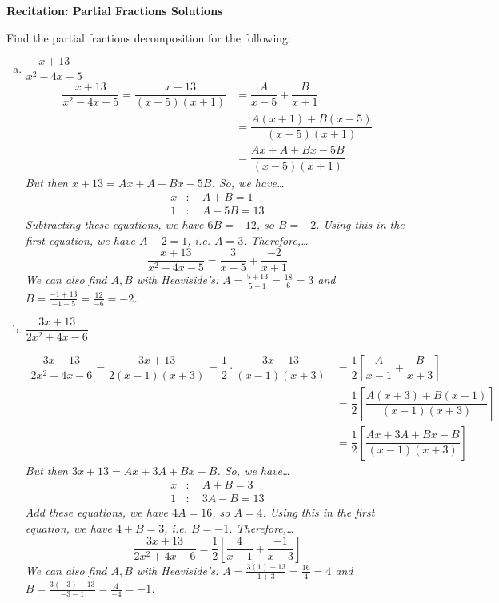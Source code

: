 \documentclass[11pt,letterpaper]{article}
\begin{document}

\phantom{} \hfill {\bfseries \Large Recitation: Partial Fractions Solutions} \hfill \phantom{} \par\vspace{0.5cm}

 Find the partial fractions decomposition for the following:
	\begin{enumerate}[(a)]
	\item $\dfrac{x + 13}{x^2 - 4x - 5}$ 
		\[
		\begin{aligned}
		\dfrac{x + 13}{x^2 - 4x - 5}= \dfrac{x + 13}{(x - 5)(x + 1)}&= \dfrac{A}{x - 5} + \dfrac{B}{x + 1} \\[0.3cm]
		&= \dfrac{A(x + 1) + B(x - 5)}{(x - 5)(x + 1)} \\[0.3cm]
		&= \dfrac{Ax + A + Bx - 5B}{(x - 5)(x + 1)}
		\end{aligned}
		\]
	{\itshape But then $x + 13= Ax + A + Bx - 5B$. So, we have\dots}
		\[
		\begin{aligned}
		x &\colon\quad A + B= 1 \\
		1 &\colon\quad A - 5B= 13
		\end{aligned}
		\]
	{\itshape Subtracting these equations, we have $6B= -12$, so $B= -2$. Using this in the first equation, we have $A - 2= 1$, i.e. $A= 3$. Therefore,\dots}
		\[
		\dfrac{x + 13}{x^2 - 4x - 5}= \boxed{\dfrac{3}{x - 5} + \dfrac{-2}{x + 1}}
		\]
	{\itshape We can also find $A, B$ with Heaviside's: $A= \tfrac{5 + 13}{5 + 1}= \tfrac{18}{6}= 3$ and $B= \tfrac{-1 + 13}{-1 - 5}= \tfrac{12}{-6}= -2$.} \par\vspace{0.3cm}
	
	\item $\dfrac{3x + 13}{2x^2 + 4x - 6}$ 
	
		\[
		\begin{aligned}
		\dfrac{3x + 13}{2x^2 + 4x - 6}= \dfrac{3x + 13}{2(x - 1)(x + 3)}= \dfrac{1}{2} \cdot \dfrac{3x + 13}{(x - 1)(x + 3)}&= \dfrac{1}{2} \left[ \dfrac{A}{x - 1} + \dfrac{B}{x + 3} \right] \\[0.3cm]
		&= \dfrac{1}{2} \left[ \dfrac{A(x + 3) + B(x - 1)}{(x - 1)(x + 3)} \right]\\[0.3cm]
		&= \dfrac{1}{2} \left[ \dfrac{Ax + 3A + Bx - B}{(x - 1)(x + 3)} \right]
		\end{aligned}
		\]
	{\itshape But then $3x + 13= Ax + 3A + Bx - B$. So, we have\dots}
		\[
		\begin{aligned}
		x &\colon\quad A + B= 3 \\
		1 &\colon\quad 3A - B= 13
		\end{aligned}
		\]
	{\itshape Add these equations, we have $4A= 16$, so $A= 4$. Using this in the first equation, we have $4 + B= 3$, i.e. $B= -1$. Therefore,\dots}
		\[
		\boxed{\dfrac{3x + 13}{2x^2 + 4x - 6}= \dfrac{1}{2} \left[ \dfrac{4}{x - 1} + \dfrac{-1}{x + 3} \right]}
		\]
	{\itshape We can also find $A, B$ with Heaviside's: $A= \tfrac{3(1) + 13}{1 + 3}= \tfrac{16}{4}= 4$ and $B= \tfrac{3(-3) + 13}{-3 - 1}= \tfrac{4}{-4}= -1$.}
	

\end{enumerate}
\end{document}
